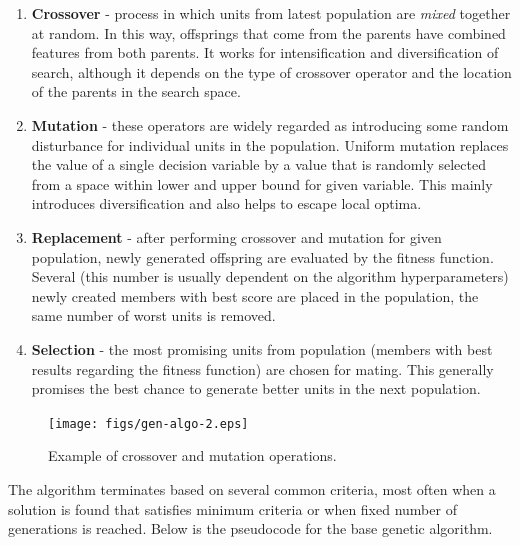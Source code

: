 \documentclass[12pt,a4paper,openany]{book}
\begin{document}


\begin{enumerate}
\item \textbf{Crossover} - process in which units from latest population are \textit{mixed} together at random. In this way, offsprings that come from the parents have combined features from both parents. It works for intensification and diversification of search, although it depends on the type of crossover operator and the location of the parents in the search space.
\item \textbf{Mutation} - these operators are widely regarded as introducing some random disturbance for individual units in the population. Uniform mutation replaces the value of a single decision variable by a value that is randomly selected from a space within lower and upper bound for given variable. This mainly introduces diversification and also helps to escape local optima.
\item \textbf{Replacement} - after performing crossover and mutation for given population, newly generated offspring are evaluated by the fitness function. Several (this number is usually dependent on the algorithm hyperparameters) newly created members with best score are placed in the population, the same number of worst units is removed.
\item \textbf{Selection} - the most promising units from population (members with best results regarding the fitness function) are chosen for mating. This generally promises the best chance to generate better units in the next population.
\end{enumerate}


 \begin{figure}[ht!]
     \centering
     \texttt{[image: figs/gen-algo-2.eps]}
     \caption{Example of crossover and mutation operations.}\label{Fig:PROGAN}
 \end{figure}
 
The algorithm terminates based on several common criteria, most often when a solution is found that satisfies minimum criteria or when fixed number of generations is reached. Below is the pseudocode for the base genetic algorithm. 
\end{document}
